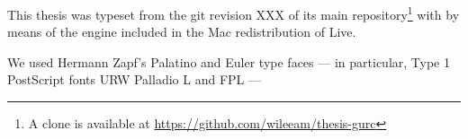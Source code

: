 
This thesis was typeset from the git revision XXX of its main repository\footnote{A 
clone is available at \url{https://github.com/wileeam/thesis-gurc}} with  by means of 
the  engine  included in the Mac redistribution 
of  Live.

We used Hermann Zapf’s Palatino and Euler type faces --- in particular, Type 1 PostScript fonts URW 
Palladio L and FPL ---
%
%
